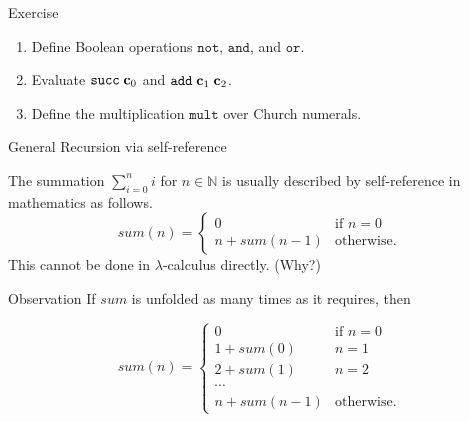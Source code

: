 \begin{frame}{Exercise}
  \begin{enumerate}
    \item Define Boolean operations $\mathtt{not}$, $\mathtt{and}$, and $\mathtt{or}$.
    \item Evaluate $\mathtt{succ}\;\mathbf{c}_0$ and $\mathtt{add}\;\mathbf{c}_{1}\;\mathbf{c}_{2}$. 
    \item Define the multiplication $\mathtt{mult}$ over Church numerals.

  \end{enumerate}
\end{frame}
\begin{frame}{General Recursion via self-reference}

  The summation $\sum_{i = 0}^{n} i$ for $n \in \mathbb{N}$ is usually
  described by self-reference in mathematics as follows.
\[
  \mathit{sum}(n) =
    \begin{cases} 
     0 & \text{if } n = 0 \\
     n + \mathit{sum}(n - 1)  & \text{otherwise}.
    \end{cases}
\]
This \alert{cannot} be done in $\lambda$-calculus directly. (Why?)

\begin{block}{Observation}
  If $\mathit{sum}$ is unfolded as many times as it requires, then

\[
  \mathit{sum}(n) =
    \begin{cases} 
     0 & \text{if } n = 0 \\
     1 + \mathit{sum}(0) & n = 1 \\
     2 + \mathit{sum}(1) & n = 2 \\
     \cdots \\
     n + \mathit{sum}(n - 1)  & \text{otherwise}.
    \end{cases}
\]
  
\end{block}



\end{frame}

